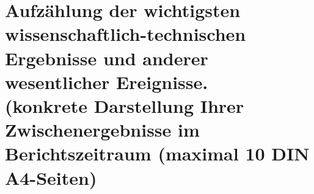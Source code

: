 ﻿\section{Aufzählung der wichtigsten wissenschaftlich-technischen Ergebnisse und anderer wesentlicher Ereignisse.\\ {\normalsize (konkrete Darstellung Ihrer Zwischenergebnisse im Berichtszeitraum (maximal 10 DIN A4-Seiten)}}
